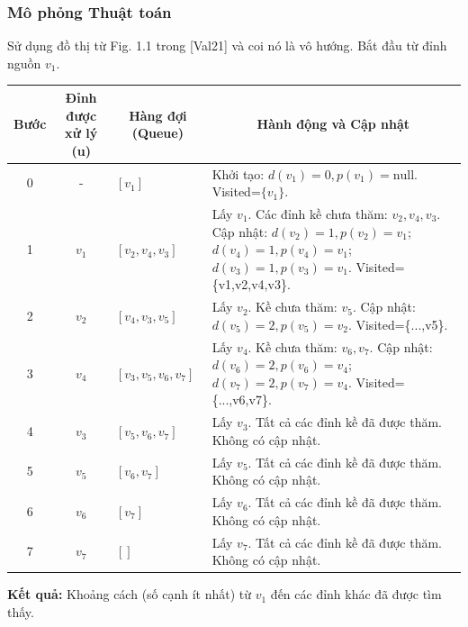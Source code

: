 \documentclass[a4paper,12pt]{article}
\begin{document}
\subsubsection{Mô phỏng Thuật toán}
Sử dụng đồ thị từ Fig. 1.1 trong [Val21] và coi nó là vô hướng. Bắt đầu từ đỉnh nguồn $v_1$.
\begin{center}
\renewcommand{\arraystretch}{1.5} %
\begin{tabular}{|c|c|l|p{6.5cm}|} %
\hline
\textbf{Bước} & \textbf{Đỉnh được xử lý (u)} & \multicolumn{1}{c|}{\textbf{Hàng đợi (Queue)}} & \multicolumn{1}{c|}{\textbf{Hành động và Cập nhật}} \\ \hline
0 & - & $[v_1]$ & Khởi tạo: $d(v_1)=0, p(v_1)=\text{null}$. Visited=$\{v_1\}$. \\ \hline
1 & $v_1$ & $[v_2, v_4, v_3]$ & Lấy $v_1$. Các đỉnh kề chưa thăm: $v_2, v_4, v_3$. \newline Cập nhật: $d(v_2)=1, p(v_2)=v_1$; $d(v_4)=1, p(v_4)=v_1$; $d(v_3)=1, p(v_3)=v_1$. Visited=\{v1,v2,v4,v3\}. \\ \hline
2 & $v_2$ & $[v_4, v_3, v_5]$ & Lấy $v_2$. Kề chưa thăm: $v_5$. \newline Cập nhật: $d(v_5)=2, p(v_5)=v_2$. Visited=\{...,v5\}. \\ \hline
3 & $v_4$ & $[v_3, v_5, v_6, v_7]$ & Lấy $v_4$. Kề chưa thăm: $v_6, v_7$. \newline Cập nhật: $d(v_6)=2, p(v_6)=v_4$; $d(v_7)=2, p(v_7)=v_4$. Visited=\{...,v6,v7\}. \\ \hline
4 & $v_3$ & $[v_5, v_6, v_7]$ & Lấy $v_3$. Tất cả các đỉnh kề đã được thăm. Không có cập nhật. \\ \hline
5 & $v_5$ & $[v_6, v_7]$ & Lấy $v_5$. Tất cả các đỉnh kề đã được thăm. Không có cập nhật. \\ \hline
6 & $v_6$ & $[v_7]$ & Lấy $v_6$. Tất cả các đỉnh kề đã được thăm. Không có cập nhật. \\ \hline
7 & $v_7$ & $[]$ & Lấy $v_7$. Tất cả các đỉnh kề đã được thăm. Không có cập nhật. \\ \hline
\end{tabular}
\end{center}
\textbf{Kết quả:} Khoảng cách (số cạnh ít nhất) từ $v_1$ đến các đỉnh khác đã được tìm thấy.
\end{document}
